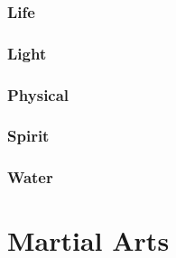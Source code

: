 \documentclass[twoside]{book}
\begin{document}
\subsection{Life}
    
\subsection{Light}
    
\subsection{Physical}
    
\subsection{Spirit}
    
\subsection{Water}
    
\chapter{Martial Arts}
    
\end{document}
